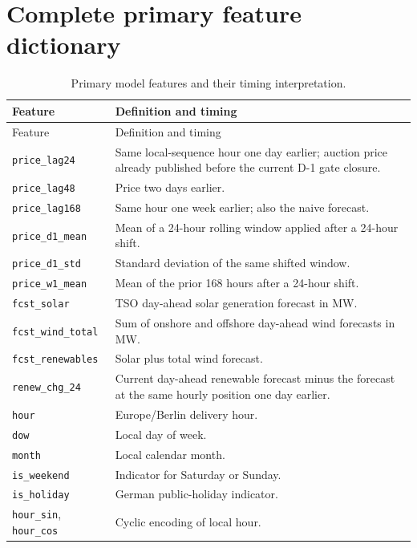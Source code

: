 \documentclass[11pt]{article}
\begin{document}
\clearpage
\appendix

\section{Complete primary feature dictionary}

\begin{longtable}{p{}p{}}
\caption{Primary model features and their timing interpretation.}
\label{tab:features}\\
\toprule
Feature & Definition and timing \\
\midrule
\endfirsthead
\toprule
Feature & Definition and timing \\
\midrule
\endhead
\texttt{price\_lag24} & Same local-sequence hour one day earlier; auction
price already published before the current D-1 gate closure. \\
\texttt{price\_lag48} & Price two days earlier. \\
\texttt{price\_lag168} & Same hour one week earlier; also the naive forecast. \\
\texttt{price\_d1\_mean} & Mean of a 24-hour rolling window applied after a
24-hour shift. \\
\texttt{price\_d1\_std} & Standard deviation of the same shifted window. \\
\texttt{price\_w1\_mean} & Mean of the prior 168 hours after a 24-hour shift. \\
\texttt{fcst\_solar} & TSO day-ahead solar generation forecast in MW. \\
\texttt{fcst\_wind\_total} & Sum of onshore and offshore day-ahead wind
forecasts in MW. \\
\texttt{fcst\_renewables} & Solar plus total wind forecast. \\
\texttt{renew\_chg\_24} & Current day-ahead renewable forecast minus the
forecast at the same hourly position one day earlier. \\
\texttt{hour} & Europe/Berlin delivery hour. \\
\texttt{dow} & Local day of week. \\
\texttt{month} & Local calendar month. \\
\texttt{is\_weekend} & Indicator for Saturday or Sunday. \\
\texttt{is\_holiday} & German public-holiday indicator. \\
\texttt{hour\_sin}, \texttt{hour\_cos} & Cyclic encoding of local hour. \\
\bottomrule
\end{longtable}
\end{document}
